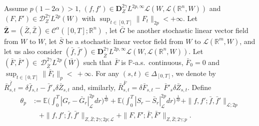 \documentclass[11pt,a4paper]{article}
\newcommand{\R}{\mathbb{R}}
\newcommand{\E}{\mathbb{E}}
\theoremstyle{plain}
\begin{document}
{Assume $p(1-2\alpha)> 1$}, $(f,f') \in \mathbf{D}_Z^{2\gamma}L^{2p,\infty}\mathscr{L}(W,\mathscr{L}(\R^n,W))$ and $(F,F')\in \mathscr{D}^{2\gamma}_ZL^{2p}(W)$ with $\sup_{t \in [0,T]} \|F_t\|_{2p}<+\infty$.
Let $\bar{\mathbf{Z}}=(\bar{Z},\bar{\mathbb{Z}}) \in \mathscr{C}^\alpha([0,T];\R^n)$
, let $\bar{G}$ be another stochastic linear vector field from $W$ to $W$, let $\bar{S}$ be a stochastic linear vector field from $W$ to $\mathscr{L}(\R^m,W)$, and let us also consider $(\bar{f},\bar{f}') \in \mathbf{D}^{2\gamma}_{\bar{Z}} L^{2p,\infty}\mathscr{L}(W,\mathscr{L}(\R^n,W))$. Let  $(\bar{F},\bar{F}') \in~\mathscr{D}^{2\gamma}_{\bar{Z}} L^{2p}(\bar{W})$ such that $\bar{F}$ is $\mathbb{P}$-a.s.\ continuous, $\bar{F}_0=0$ and $\sup_{t \in [0,T]} \|\bar{F}_t\|_p <~+\infty$. For any $(s,t) \in \Delta_{[0,T]}$, we denote by $\bar{R}^{\bar{f}}_{s,t} = \delta \bar{f}_{s,t} - \bar{f}'_s\delta \bar{Z}_{s,t}$ and, similarly, $\bar{R}^{\bar{F}}_{s,t} = \delta \bar{F}_{s,t} -~\bar{F}'_s\delta \bar{Z}_{s,t}$.
 Define
 \begin{equation*}\label{eq:theta} \begin{aligned}
    \theta_p &:= { \E\Big(\int_0^T |G_r-\bar{G}_r|_\mathscr{L}^{2p} dr\Big)^\frac{1}{2p}+ \E\Big(\int_0^T |S_r-\bar{S}_r|_\mathscr{L}^{2p} dr\Big)^\frac{1}{2p} } +  \| f,f' ; \bar f , \bar f' \|_{\mathscr{L};2p}  \\
    & \quad + \| f,f' ; \bar f, \bar f' \|_{Z,\bar Z ; 2\gamma; 2p; \mathscr{L}} + \|F,F' ; \bar F , \bar F'\|_{Z,\bar Z;2\gamma;p} .
    \end{aligned}
\end{equation*}
\end{document}
